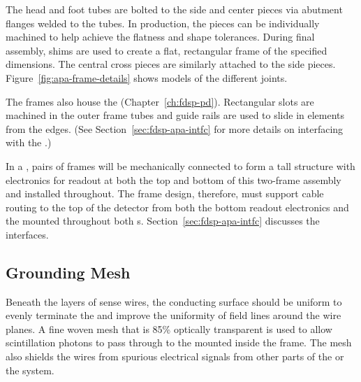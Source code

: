 The head and foot tubes are bolted to the side and center pieces via abutment flanges welded to the tubes. In production, the pieces can be individually machined to help achieve the flatness and shape tolerances.  During final assembly, shims are used to create a flat, rectangular frame of the specified dimensions.  The central cross pieces are similarly attached to the side pieces.  Figure~\ref{fig:apa-frame-details} shows models of the different joints.   



The  frames also house the  (Chapter~\ref{ch:fdsp-pd}).  %
Rectangular slots are machined in the outer frame tubes and guide rails are used to slide in  elements from the edges. %
(See Section~\ref{sec:fdsp-apa-intfc} for more details on interfacing with the .)   

In a  , pairs of  frames will be mechanically connected to form a \tpcheight %
tall structure with electronics for  readout at both the top and bottom of this two-frame assembly and  installed throughout.  The  frame design, therefore, must support cable routing to the top of the detector from both the bottom  readout electronics and the  mounted throughout both s.  Section~\ref{sec:fdsp-apa-intfc} discusses the interfaces.



\subsection{Grounding Mesh}
\label{sec:fdsp-apa-mesh}

Beneath the layers of sense wires, the conducting surface should be uniform to evenly terminate the \efield and improve the uniformity of field lines around the wire planes. A fine woven mesh that is \num{85}\% optically transparent is used to allow scintillation photons to pass through to the  mounted inside the frame.  The mesh also shields the  wires from spurious electrical signals from other parts of the  or the  system.  


